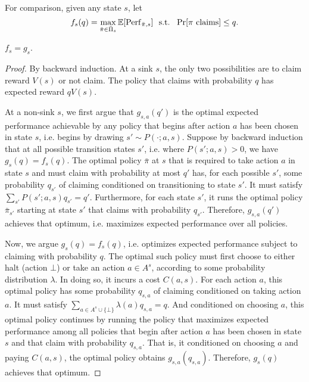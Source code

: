 For comparison, given any state $s$, let
 \[ f_s(q) = \max_{\bar{\pi} \in \bar{\Pi}_s} \operatorname*{\mathbb{E}}[ \mathrm{Perf}_{\bar{\pi},s} ] ~~ \text{s.t.} ~~ \Pr[\text{$\pi$ claims}] \leq q.  \]

\begin{lemma} \label{lemma:exante-f-g}
  $f_s = g_s$.
\end{lemma}
\begin{proof}
  By backward induction.
  At a sink $s$, the only two possibilities are to claim reward $V(s)$ or not claim.
  The policy that claims with probability $q$ has expected reward $q V(s)$.

  At a non-sink $s$, we first argue that $g_{s,a}(q')$ is the optimal expected performance achievable by any policy that begins after action $a$ has been chosen in state $s$, i.e. begins by drawing $s' \sim P(\cdot;a,s)$.
  Suppose by backward induction that at all possible transition states $s'$, i.e. where $P(s';a,s) > 0$, we have $g_s(q) = f_s(q)$.
  The optimal policy $\bar{\pi}$ at $s$ that is required to take action $a$ in state $s$ and must claim with probability at most $q'$ has, for each possible $s'$, some probability $q_{s'}$ of claiming conditioned on transitioning to state $s'$.
  It must satisfy $\sum_{s'} P(s';a,s) q_{s'} = q'$.
  Furthermore, for each state $s'$, it runs the optimal policy $\bar{\pi}_{s'}$ starting at state $s'$ that claims with probability $q_{s'}$.
  Therefore, $g_{s,a}(q')$ achieves that optimum, i.e. maximizes expected performance over all policies.

  Now, we argue $g_s(q) = f_s(q)$, i.e. optimizes expected performance subject to claiming with probability $q$.
  The optimal such policy must first choose to either halt (action $\bot$) or take an action $a \in A^s$, according to some probability distribution $\lambda$.
  In doing so, it incurs a cost $C(a,s)$.
  For each action $a$, this optimal policy has some probability $q_{s,a}$ of claiming conditioned on taking action $a$.
  It must satisfy $\sum_{a \in A^s \cup \{\bot\}} \lambda(a) q_{s,a} = q$.
  And conditioned on choosing $a$, this optimal policy continues by running the policy that maximizes expected performance among all policies that begin after action $a$ has been chosen in state $s$ and that claim with probability $q_{s,a}$.
  That is, it conditioned on choosing $a$ and paying $C(a,s)$, the optimal policy obtains $g_{s,a}(q_{s,a})$.
  Therefore, $g_s(q)$ achieves that optimum.
\end{proof}

